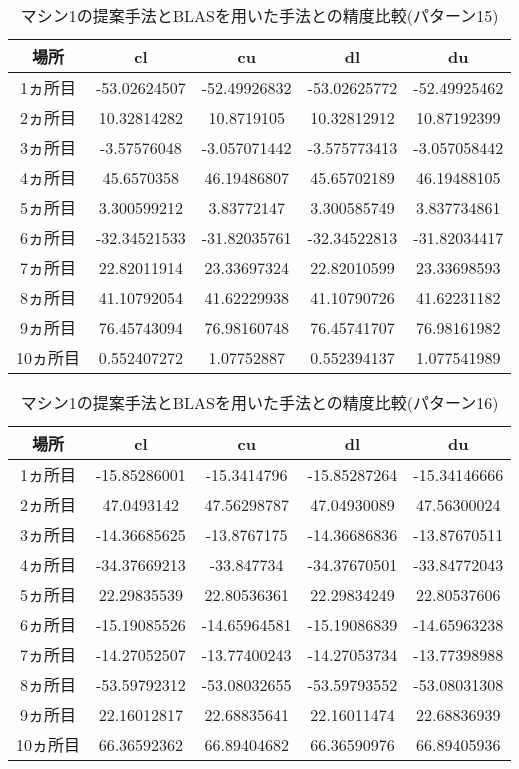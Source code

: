 \documentclass[11pt,a4paper]{jsreport}
\theoremstyle{definition}
\begin{document}
\begin{table}[H]
\centering
\begin{tabular}{|c|c|c|c|c|}
\hline
場所 & cl & cu & dl & du \\ \hline
1ヵ所目 & -53.02624507 & -52.49926832 & -53.02625772 & -52.49925462 \\ \hline
2ヵ所目 & 10.32814282 & 10.8719105 & 10.32812912 & 10.87192399 \\ \hline
3ヵ所目 & -3.57576048 & -3.057071442 & -3.575773413 & -3.057058442 \\ \hline
4ヵ所目 & 45.6570358 & 46.19486807 & 45.65702189 & 46.19488105 \\ \hline
5ヵ所目 & 3.300599212 & 3.83772147 & 3.300585749 & 3.837734861 \\ \hline
6ヵ所目 & -32.34521533 & -31.82035761 & -32.34522813 & -31.82034417 \\ \hline
7ヵ所目 & 22.82011914 & 23.33697324 & 22.82010599 & 23.33698593 \\ \hline
8ヵ所目 & 41.10792054 & 41.62229938 & 41.10790726 & 41.62231182 \\ \hline
9ヵ所目 & 76.45743094 & 76.98160748 & 76.45741707 & 76.98161982 \\ \hline
10ヵ所目 & 0.552407272 & 1.07752887 & 0.552394137 & 1.077541989 \\ \hline
\end{tabular}
\caption{マシン1の提案手法とBLASを用いた手法との精度比較(パターン15)}
\end{table}

\begin{table}[H]
\centering
\begin{tabular}{|c|c|c|c|c|}
\hline
場所 & cl & cu & dl & du \\ \hline
1ヵ所目 & -15.85286001 & -15.3414796 & -15.85287264 & -15.34146666 \\ \hline
2ヵ所目 & 47.0493142 & 47.56298787 & 47.04930089 & 47.56300024 \\ \hline
3ヵ所目 & -14.36685625 & -13.8767175 & -14.36686836 & -13.87670511 \\ \hline
4ヵ所目 & -34.37669213 & -33.847734 & -34.37670501 & -33.84772043 \\ \hline
5ヵ所目 & 22.29835539 & 22.80536361 & 22.29834249 & 22.80537606 \\ \hline
6ヵ所目 & -15.19085526 & -14.65964581 & -15.19086839 & -14.65963238 \\ \hline
7ヵ所目 & -14.27052507 & -13.77400243 & -14.27053734 & -13.77398988 \\ \hline
8ヵ所目 & -53.59792312 & -53.08032655 & -53.59793552 & -53.08031308 \\ \hline
9ヵ所目 & 22.16012817 & 22.68835641 & 22.16011474 & 22.68836939 \\ \hline
10ヵ所目 & 66.36592362 & 66.89404682 & 66.36590976 & 66.89405936 \\ \hline
\end{tabular}
\caption{マシン1の提案手法とBLASを用いた手法との精度比較(パターン16)}
\end{table}
\end{document}
